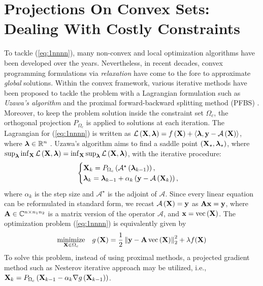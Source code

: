 \documentclass[12pt,draftcls,onecolumn]{IEEEtran}
\begin{document}
\section{Projections On Convex Sets: Dealing With Costly Constraints}
\label{sec_1}
To tackle (\ref{eq:1nnnn}), many non-convex and local optimization algorithms have been developed over the years. Nevertheless, in recent decades, convex programming formulations via \emph{relaxation} have come to the fore to approximate \emph{global} solutions. Within the convex framework, various iterative methods have been proposed to tackle the problem with a Lagrangian formulation such as \emph{Uzawa's algorithm} and the proximal forward-backward splitting method (PFBS) \cite{daubechies2004iterative,combettes2005signal,cai2010singular}. Moreover, to keep the problem solution inside the constraint set $\Omega_{c}$, the orthogonal projection $P_{\Omega_{c}}$ is applied to solutions at each iteration.
The Lagrangian for (\ref{eq:1nnnn}) is written as 
$\mathcal{L}\left(\mathbf{X},\boldsymbol{\lambda}\right)= f\left(\mathbf{X}\right)+	\left\langle \boldsymbol{\lambda},\mathbf{y}-\mathcal{A}\left(\mathbf{X}\right)\right\rangle$,
where $\boldsymbol{\lambda}\in \mathbb{R}^{n}$ \cite{cai2010singular}. Uzawa's algorithm aims to find a saddle point $\left(\mathbf{X}_{\star},\boldsymbol{\lambda}_{\star}\right)$, where $\sup_{\boldsymbol{\lambda}}\inf_{\mathbf{X}} \mathcal{L}\left(\mathbf{X},\boldsymbol{\lambda}\right)=\inf_{\mathbf{X}}\sup_{\boldsymbol{\lambda}} \mathcal{L}\left(\mathbf{X},\boldsymbol{\lambda}\right)$, with the iterative procedure:
\begin{equation}
\label{eq:3}
\begin{aligned}
\begin{cases}\mbX_{k}=P_{\Omega_{c}}\left(\mathcal{A}^{\star}\left(\blambda_{k-1}\right)\right), \\ \blambda_{k}=\blambda_{k-1}+\alpha_{k}\left(\mathbf{y}-\mathcal{A}\left(\mbX_{k}\right)\right),\end{cases}
\end{aligned}
\end{equation}\normalsize
where $\alpha_{k}$ is the step size and $\mathcal{A}^{\star}$ is the adjoint of $\mathcal{A}$.
Since every linear equation can be reformulated in standard form, we recast $\mathcal{A}\left(\mathbf{X}\right)=\mathbf{y}$ as $\mathbf{A}\mathbf{x}=\mathbf{y}$, where $\mathbf{A}\in \mathbb{C}^{n\times n_{1} n_{2}}$ is a matrix version of the operator $\mathcal{A}$, and  $\mathbf{x}=\operatorname{vec}\left(\mathbf{X}\right)$\cite{recht2011null}. 
The optimization problem (\ref{eq:1nnnn}) is equivalently given by \cite{cai2010singular,yin2008bregman}
\begin{equation}
\label{eq:4}
\begin{aligned}
\underset{\mbX \in \Omega_{c}}{\textrm{minimize}}\quad g\left(\mbX\right)=\frac{1}{2}\left\|\mathbf{y}-\mbA\operatorname{vec}\left(\mbX\right)\right\|^{2}_{2}+\lambda f(\mbX)
\end{aligned}
\end{equation}
To solve this problem, instead of using proximal methods, a projected gradient method such as Nesterov iterative approach may be utilized, i.e., 
$\mathbf{X}_{k}=P_{\Omega_{c}}\left(\mathbf{X}_{k-1}-\alpha_{k}\nabla g\left(\mathbf{X}_{k-1}\right)\right)$.
\end{document}
